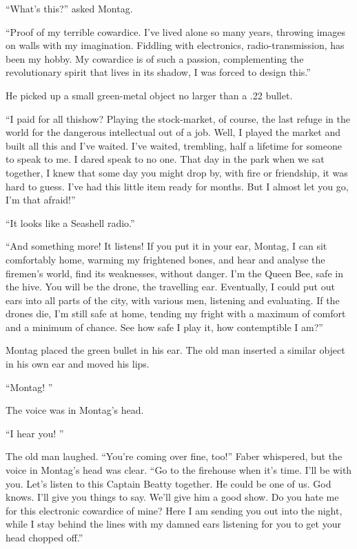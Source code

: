 \documentclass[11pt,openany]{book}
\begin{document}
``What's this?'' asked Montag.

``Proof of my terrible cowardice. I've lived alone so many years, throwing images on walls with my imagination. Fiddling with electronics, radio-transmission, has been my hobby. My cowardice is of such a passion, complementing the revolutionary spirit that lives in its shadow, I was forced to design this.''

He picked up a small green-metal object no larger than a .22 bullet.

``I paid for all thishow? Playing the stock-market, of course, the last refuge in the world for the dangerous intellectual out of a job. Well, I played the market and built all this and I've waited. I've waited, trembling, half a lifetime for someone to speak to me. I dared speak to no one. That day in the park when we sat together, I knew that some day you might drop by, with fire or friendship, it was hard to guess. I've had this little item ready for months. But I almost let you go, I'm that afraid!''

``It looks like a Seashell radio.''

``And something more! It listens! If you put it in your ear, Montag, I can sit comfortably home, warming my frightened bones, and hear and analyse the firemen's world, find its weaknesses, without danger. I'm the Queen Bee, safe in the hive. You will be the drone, the travelling ear. Eventually, I could put out ears into all parts of the city, with various men, listening and evaluating. If the drones die, I'm still safe at home, tending my fright with a maximum of comfort and a minimum of chance. See how safe I play it, how contemptible I am?''

Montag placed the green bullet in his ear. The old man inserted a similar object in his own ear and moved his lips.

``Montag! ''

The voice was in Montag's head.

``I hear you! ''

The old man laughed. ``You're coming over fine, too!'' Faber whispered, but the voice in Montag's head was clear. ``Go to the firehouse when it's time. I'll be with you. Let's listen to this Captain Beatty together. He could be one of us. God knows. I'll give you things to say. We'll give him a good show. Do you hate me for this electronic cowardice of mine? Here I am sending you out into the night, while I stay behind the lines with my damned ears listening for you to get your head chopped off.''
\end{document}
